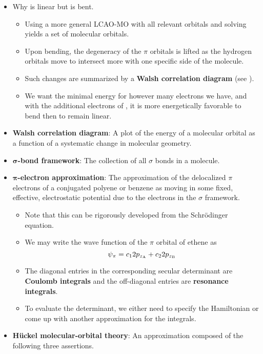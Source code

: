 \documentclass[../notes.tex]{subfiles}
\begin{document}
\begin{itemize}
\begin{itemize}
    \end{itemize}
    \item Why  is linear but  is bent.
    \begin{itemize}
        \item Using a more general LCAO-MO with all relevant orbitals and solving yields a set of molecular orbitals.
        \item Upon bending, the degeneracy of the $\pi$ orbitals is lifted as the hydrogen orbitals move to intersect more with one specific side of the molecule.
        \item Such changes are summarized by a \textbf{Walsh correlation diagram} (see \textcite[65]{bib:IChemNotes}).
        \item We want the minimal energy for however many electrons we have, and with the additional electrons of , it is more energetically favorable to bend then to remain linear.
    \end{itemize}
    \item \textbf{Walsh correlation diagram}: A plot of the energy of a molecular orbital as a function of a systematic change in molecular geometry.
    \item \textbf{$\bm{\sigma}$-bond framework}: The collection of all $\sigma$ bonds in a molecule.
    \item \textbf{$\bm{\pi}$-electron approximation}: The approximation of the delocalized $\pi$ electrons of a conjugated polyene or benzene as moving in some fixed, effective, electrostatic potential due to the electrons in the $\sigma$ framework.
    \begin{itemize}
        \item Note that this can be rigorously developed from the Schr\"{o}dinger equation.
        \item We may write the wave function of the $\pi$ orbital of ethene as
        \begin{equation*}
            \psi_\pi = c_12p_{z_{\ce{A}}}+c_22p_{z_{\ce{B}}}
        \end{equation*}
        \item The diagonal entries in the corresponding secular determinant are \textbf{Coulomb integrals} and the off-diagonal entries are \textbf{resonance integrals}.
        \item To evaluate the determinant, we either need to specify the Hamiltonian or come up with another approximation for the integrals.
    \end{itemize}
    \item \textbf{H\"{u}ckel molecular-orbital theory}: An approximation composed of the following three assertions.

\end{itemize}
\end{document}
